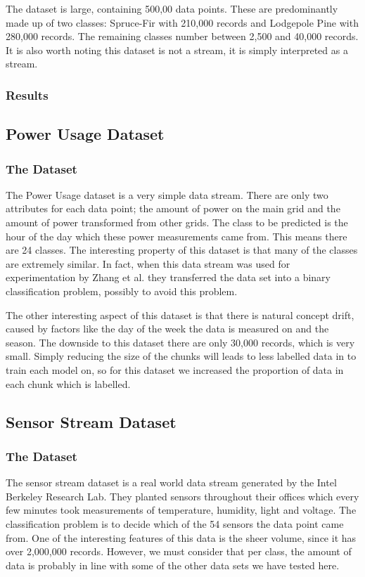 \documentclass[12pt,a4paper,oneside]{report}
\begin{document}
The dataset is large, containing 500,00 data points. These are predominantly made up of two classes: Spruce-Fir with 210,000 records and Lodgepole Pine with 280,000 records. The remaining classes number between 2,500 and 40,000 records. It is also worth noting this dataset is not a stream, it is simply interpreted as a stream. 


\subsubsection{Results}

\subsection{Power Usage Dataset}
\subsubsection{The Dataset}
The Power Usage dataset is a very simple data stream. There are only two attributes for each data point; the amount of power on the main grid and the amount of power transformed from other grids. The class to be predicted is the hour of the day which these power measurements came from. This means there are 24 classes. The interesting property of this dataset is that many of the classes are extremely similar. In fact, when this data stream was used for experimentation by Zhang et al.\cite{Zhang} they transferred the data set into a binary classification problem, possibly to avoid this problem. 

The other interesting aspect of this dataset is that there is natural concept drift, caused by factors like the  day of the week the data is measured on and the season. The downside to this dataset there are only 30,000 records, which is very small. Simply reducing the size of the chunks will leads to less labelled data in to train each model on, so for this dataset we increased the proportion of data in each chunk which is labelled. 

\subsection{Sensor Stream Dataset}
\subsubsection{The Dataset}
The sensor stream dataset is a real world data stream generated by the Intel Berkeley Research Lab. They planted sensors throughout their offices which every few minutes took measurements of temperature, humidity, light and voltage. The classification problem is to decide which of the 54 sensors the data point came from. One of the interesting features of this data is the sheer volume, since it has over 2,000,000 records. However, we must consider that per class, the amount of data is probably in line with some of the other data sets we have tested here.  
\end{document}
